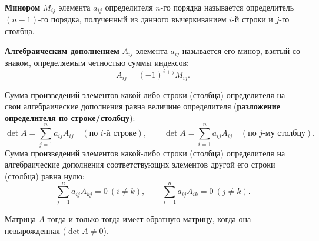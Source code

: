 \documentclass[10pt]{article}
\begin{document}
\begin{definition}
\textbf{Минором} \(M_{ij}\) элемента \(a_{ij}\) определителя \(n\)-го порядка называется определитель \((n-1)\)-го порядка, полученный из данного вычеркиванием \(i\)-й строки и \(j\)-го столбца.
\end{definition}

\begin{definition}
\textbf{Алгебраическим дополнением} \(A_{ij}\) элемента \(a_{ij}\) называется его минор, взятый со знаком, определяемым четностью суммы индексов:
\begin{equation} \label{eq:alg_cofactor}
A_{ij} = (-1)^{i+j} M_{ij}.
\end{equation}
\end{definition}

\begin{theorem}
Сумма произведений элементов какой-либо строки (столбца) определителя на свои алгебраические дополнения равна величине определителя (\textbf{разложение определителя по строке/столбцу}):
\[
\det A = \sum_{j=1}^{n} a_{ij} A_{ij} \quad (\text{по } i\text{-й строке}), \qquad
\det A = \sum_{i=1}^{n} a_{ij} A_{ij} \quad (\text{по } j\text{-му столбцу}).
\]
Сумма произведений элементов какой-либо строки (столбца) определителя на алгебраические дополнения соответствующих элементов другой его строки (столбца) равна нулю:
\[
\sum_{j=1}^{n} a_{ij} A_{kj} = 0 \ (i \neq k), \qquad
\sum_{i=1}^{n} a_{ij} A_{ik} = 0 \ (j \neq k).
\]
\end{theorem}

\begin{theorem}
Матрица \(A\) тогда и только тогда имеет обратную матрицу, когда она невырожденная (\(\det A \neq 0\)).
\end{theorem}
\end{document}
